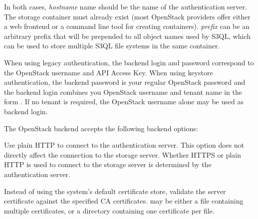 \documentclass[letterpaper,10pt,english]{sphinxmanual}
\begin{document}
In both cases, \emph{hostname} name should be the name of the
authentication server.  The storage container must already exist (most
OpenStack providers offer either a web frontend or a command line tool
for creating containers). \emph{prefix} can be an arbitrary prefix that
will be prepended to all object names used by S3QL, which can be used
to store multiple S3QL file systems in the same container.

When using legacy authentication, the backend login and password
correspond to the OpenStack username and API Access Key. When using
keystore authentication, the backend password is your regular
OpenStack password and the backend login combines you OpenStack
username and tenant name in the form . If no tenant
is required, the OpenStack username alone may be used as backend
login.

The OpenStack backend accepts the following backend options:

\begin{fulllineitems}
\label{backends:cmdoption-swift_backend-arg-no-ssl}
Use plain HTTP to connect to the authentication server. This option
does not directly affect the connection to the storage
server. Whether HTTPS or plain HTTP is used to connect to the
storage server is determined by the authentication server.

\end{fulllineitems}


\begin{fulllineitems}
\label{backends:cmdoption-swift_backend-arg-ssl-ca-path}
Instead of using the system's default certificate store, validate
the server certificate against the specified CA
certificates.  may be either a file containing
multiple certificates, or a directory containing one certificate
per file.

\end{fulllineitems}

\end{document}

